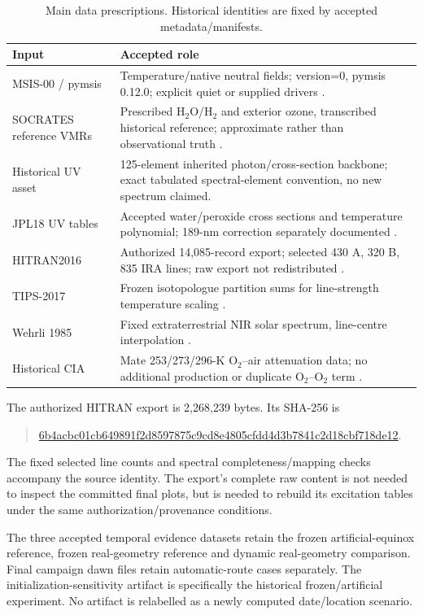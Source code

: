 \begin{table}[htbp]\centering\small
\caption{Main data prescriptions. Historical identities are fixed by accepted metadata/manifests.}\label{tab:provenance}
\begin{tabular}{p{}p{}}\toprule Input & Accepted role\\\midrule
MSIS-00 / pymsis & Temperature/native neutral fields; version=0, pymsis 0.12.0; explicit quiet or supplied drivers \citep{picone2002}.\\
SOCRATES reference VMRs & Prescribed H$_2$O/H$_2$ and exterior ozone, transcribed historical reference; approximate rather than observational truth \citep{brasseur2005}.\\
Historical UV asset & 125-element inherited photon/cross-section backbone; exact tabulated spectral-element convention, no new spectrum claimed.\\
JPL18 UV tables & Accepted water/peroxide cross sections and temperature polynomial; 189-nm correction separately documented \citep{jpl18}.\\
HITRAN2016 & Authorized 14,085-record export; selected 430 A, 320 B, 835 IRA lines; raw export not redistributed \citep{hitran2016}.\\
TIPS-2017 & Frozen isotopologue partition sums for line-strength temperature scaling \citep{tips2017}.\\
Wehrli 1985 & Fixed extraterrestrial NIR solar spectrum, line-centre interpolation \citep{wehrli1985}.\\
Historical CIA & Mate 253/273/296-K O$_2$--air attenuation data; no additional production or duplicate O$_2$--O$_2$ term \citep{mate1999}.\\\bottomrule
\end{tabular}\end{table}

The authorized HITRAN export is 2,268,239 bytes. Its SHA-256 is
\begin{quote}\footnotesize\url{6b4acbc01cb649891f2d8597875c9cd8e4805cfdd4d3b7841c2d18cbf718de12}.\end{quote}
The fixed selected line counts and spectral completeness/mapping checks accompany the source identity. The export's complete raw content is not needed to inspect the committed final plots, but is needed to rebuild its excitation tables under the same authorization/provenance conditions.

The three accepted temporal evidence datasets retain the frozen artificial-equinox reference, frozen real-geometry reference and dynamic real-geometry comparison. Final campaign dawn files retain automatic-route cases separately. The initialization-sensitivity artifact is specifically the historical frozen/artificial experiment. No artifact is relabelled as a newly computed date/location scenario.


